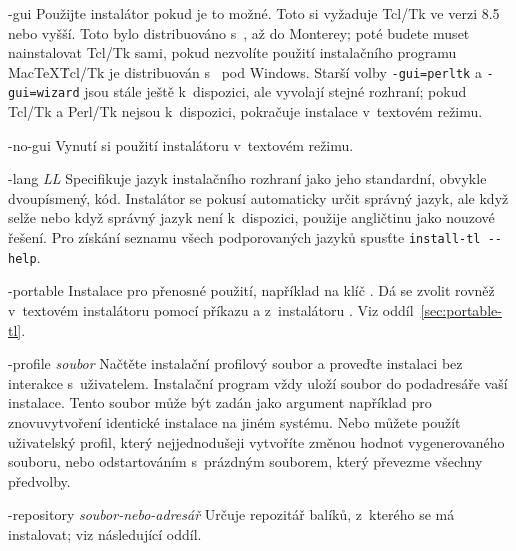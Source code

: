 \documentclass[\classoptions,slovak,english,czech]{\classname}
\begin{document}
\begin{ttdescription}
\item[-gui] Použijte \GUI{} instalátor pokud je to možné. Toto si vyžaduje
Tcl/Tk ve verzi 8.5 nebo vyšší. Toto bylo distribuováno s~\MacOSX, až do
Monterey; poté budete muset nainstalovat Tcl/Tk sami, pokud nezvolíte
použití instalačního programu Mac\TeX\. Tcl/Tk je 
distribuován s~\TL{} pod Windows. Starší volby \texttt{-gui=perltk} 
a \texttt{-gui=wizard} jsou stále ještě k~dispozici, ale vyvolají stejné \GUI{} rozhraní; 
pokud Tcl/Tk a Perl/Tk nejsou k~dispozici, pokračuje instalace 
v~textovém režimu.   

\item[-no-gui] Vynutí si použití instalátoru v~textovém režimu.


\item[-lang {\sl LL}] Specifikuje jazyk instalačního rozhraní jako 
  jeho standardní, obvykle dvoupísmený, kód. Instalátor se pokusí 
  automaticky určit správný jazyk, ale když selže nebo když správný jazyk není
  k~dispozici, použije angličtinu jako nouzové řešení. 
  Pro získání seznamu všech podporovaných jazyků spusťte
  \verb|install-tl --help|.

\item[-portable] Instalace pro přenosné použití, například na klíč \USB{}.
  Dá se zvolit rovněž v~textovém instalátoru pomocí příkazu 
  a z~instalátoru \GUI{}. Viz oddíl~\ref{sec:portable-tl}.

\item[-profile {\sl soubor}] Načtěte instalační profilový 
  soubor a proveďte instalaci bez interakce s~uživatelem.
  Instalační program vždy uloží soubor
   do podadresáře  vaší instalace.  
  Tento soubor může být zadán jako argument například pro znovuvytvoření
  identické instalace na jiném systému. Nebo můžete  
  použít uživatelský profil, který nejjednodušeji 
  vytvoříte změnou hodnot vygenerovaného
  souboru, nebo odstartováním s~prázdným souborem, 
  který převezme všechny předvolby.

\item [-repository {\sl soubor-nebo-adresář}] Určuje 
  repozitář balíků, z~kterého se má instalovat; viz následující oddíl.


\end{ttdescription}
\end{document}
